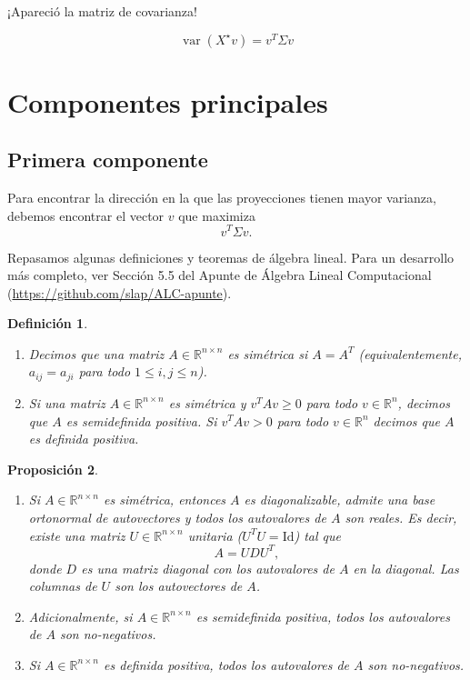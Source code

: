 \documentclass[a4paper]{article}
\DeclareMathOperator{\var}{var}
\newtheorem{prop}{Proposici\'on}
\newtheorem{defi}[prop]{Definici\'on}
\newcommand{\R}{{\mathbb R}}
\newcommand{\Id}{\textrm {Id}}
\begin{document}
¡Apareció la matriz de covarianza!

$$
\var(X^\star v) = v^T \Sigma v
$$


\section{Componentes principales}

\subsection{Primera componente}
Para encontrar la dirección en la que las proyecciones tienen mayor varianza, debemos encontrar el vector $v$ que maximiza
$$v^T \Sigma v.$$

Repasamos algunas definiciones y teoremas de álgebra lineal. Para un desarrollo más completo, ver Sección 5.5 del Apunte de \'Algebra Lineal Computacional (\url{https://github.com/slap/ALC-apunte}).


\begin{defi}\hfill
\begin{enumerate}
\item Decimos que una matriz $A \in \R^{n \times n}$ es \emph{simétrica} si $A = A^T$ (equivalentemente, $a_{ij} = a_{ji}$ para todo $1 \le i, j \le n$).
\item Si una matriz $A \in \R^{n \times n}$ es simétrica y $v^T A v \ge 0$ para todo $v \in \R^n$, decimos que $A$ es \emph{semidefinida positiva}. Si $v^T A v > 0$ para todo $v \in \R^n$ decimos que $A$ es \emph{definida positiva}.
\end{enumerate}
\end{defi}

\begin{prop}\hfill
\begin{enumerate}
\item Si $A \in \R^{n \times n}$ es simétrica, entonces $A$ es diagonalizable, admite una base ortonormal de autovectores y todos los autovalores de $A$ son reales. Es decir, existe una matriz $U \in \R^{n \times n}$ unitaria ($U^T U = \Id$) tal que
    $$
    A = U D U^T,
    $$
donde $D$ es una matriz diagonal con los autovalores de $A$ en la diagonal. Las columnas de $U$ son los autovectores de $A$.
\item Adicionalmente, si $A \in \R^{n \times n}$ es semidefinida positiva, todos los autovalores de $A$ son no-negativos.
\item Si $A \in \R^{n \times n}$ es definida positiva, todos los autovalores de $A$ son no-negativos.
\end{enumerate}
\end{prop}
\end{document}
